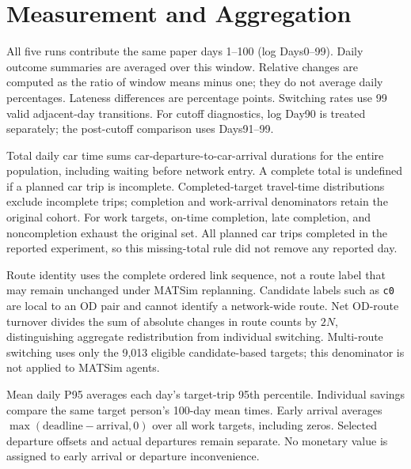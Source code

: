 
\section{Measurement and Aggregation}
\label{app:measurement}

All five runs contribute the same paper days 1--100 (log Days0--99). Daily outcome summaries are averaged over this window. Relative changes are computed as the ratio of window means minus one; they do not average daily percentages. Lateness differences are percentage points. Switching rates use 99 valid adjacent-day transitions. For cutoff diagnostics, log Day90 is treated separately; the post-cutoff comparison uses Days91--99.

Total daily car time sums car-departure-to-car-arrival durations for the entire population, including waiting before network entry. A complete total is undefined if a planned car trip is incomplete. Completed-target travel-time distributions exclude incomplete trips; completion and work-arrival denominators retain the original cohort. For work targets, on-time completion, late completion, and noncompletion exhaust the original set. All planned car trips completed in the reported experiment, so this missing-total rule did not remove any reported day.

Route identity uses the complete ordered link sequence, not a route label that may remain unchanged under MATSim replanning. Candidate labels such as \texttt{c0} are local to an OD pair and cannot identify a network-wide route. Net OD-route turnover divides the sum of absolute changes in route counts by $2N$, distinguishing aggregate redistribution from individual switching. Multi-route switching uses only the 9,013 eligible candidate-based targets; this denominator is not applied to MATSim agents.

Mean daily P95 averages each day's target-trip 95th percentile. Individual savings compare the same target person's 100-day mean times. Early arrival averages $\max(\mathrm{deadline}-\mathrm{arrival},0)$ over all work targets, including zeros. Selected departure offsets and actual departures remain separate. No monetary value is assigned to early arrival or departure inconvenience.

